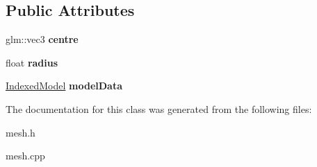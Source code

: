 \subsection*{Public Attributes}
\begin{DoxyCompactItemize}
\item 
glm\+::vec3 {\bfseries centre}\hypertarget{class_mesh_a2416d7b5352e7278ad988652ad144456}{}\label{class_mesh_a2416d7b5352e7278ad988652ad144456}

\item 
float {\bfseries radius}\hypertarget{class_mesh_a5fc0e801c0a883e0b759dcc380f20144}{}\label{class_mesh_a5fc0e801c0a883e0b759dcc380f20144}

\item 
\hyperlink{class_indexed_model}{Indexed\+Model} {\bfseries model\+Data}\hypertarget{class_mesh_a40c3a6a03dd76f1856abce53948919c5}{}\label{class_mesh_a40c3a6a03dd76f1856abce53948919c5}

\end{DoxyCompactItemize}


The documentation for this class was generated from the following files\+:\begin{DoxyCompactItemize}
\item 
mesh.\+h\item 
mesh.\+cpp\end{DoxyCompactItemize}
